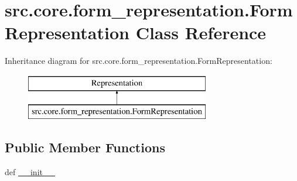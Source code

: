 \hypertarget{classsrc_1_1core_1_1form__representation_1_1_form_representation}{\section{src.\+core.\+form\+\_\+representation.\+Form\+Representation Class Reference}
\label{classsrc_1_1core_1_1form__representation_1_1_form_representation}
}
Inheritance diagram for src.\+core.\+form\+\_\+representation.\+Form\+Representation\+:\begin{figure}[H]
\begin{center}
\leavevmode
\includegraphics[height=2.000000cm]{classsrc_1_1core_1_1form__representation_1_1_form_representation}
\end{center}
\end{figure}
\subsection*{Public Member Functions}
\begin{DoxyCompactItemize}
\item 
def \hyperlink{classsrc_1_1core_1_1form__representation_1_1_form_representation_a1ee2134537d3b54509f31ddd9fa21ead}{\+\_\+\+\_\+init\+\_\+\+\_\+}
\end{DoxyCompactItemize}

